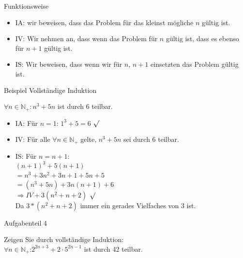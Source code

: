 \documentclass[18pt]{beamer}
\begin{document}
	\begin{frame} {Funktionsweise}
		\begin{itemize}
			\item IA: wir beweisen, dass das Problem f\"ur das kleinst m\"ogliche $n$ g\"ultig ist.
			\pause
			\item IV: Wir nehmen an, dass wenn das Problem f\"ur $n$ g\"ultig ist, dass es ebenso f\"ur $n+1$ g\"ultig ist.
			\pause
			\item IS: Wir beweisen, dass wenn wir f\"ur $n$, $n+1$ einsetzten das Problem g\"ultig ist.
		\end{itemize}
	\end{frame}
	
	
	\begin{frame} {Beispiel Vollst\"andige Induktion}
		\begin{block}{}
			$\forall n \in \mathbb{N}_+ : n^3 + 5n$ ist durch 6 teilbar.
		\end{block}
		
		\begin{block}{}
			\begin{itemize}
				\item IA: F\"ur $n = 1$: $1^3 + 5 = 6$ $\surd$
				\pause
				\item IV: F\"ur alle $\forall n \in \mathbb{N}_+$ gelte, $n^3 + 5n$ sei durch 6 teilbar.
				\pause
				\item IS: F\"ur $n = n+1$: \\
				 $(n+1)^3 + 5(n+1)$\\
				\pause
				 $=n^3 + 3n^2 + 3n + 1 + 5n + 5$\\
				\pause
				 $=(n^3 + 5n) + 3n(n+1) + 6$\\
				\pause
				 $\Rightarrow IV + 3(n^2+n+2)$ $\surd$\\
				 Da $3*(n^2+n+2)$ immer ein gerades Vielfaches von 3 ist.
			\end{itemize}
		\end{block}
	\end{frame}
	
	
	\begin{frame} {Aufgabenteil 4}
		\begin{block} {}
			Zeigen Sie durch vollst\"andige Induktion:\\
			\vspace{10pt}
			$\forall n \in \mathbb{N}_+$:$2^{2n+3}+2\cdot5^{2n-1}$ ist durch 42 teilbar.
		\end{block}
	\end{frame}
	
\end{document}
